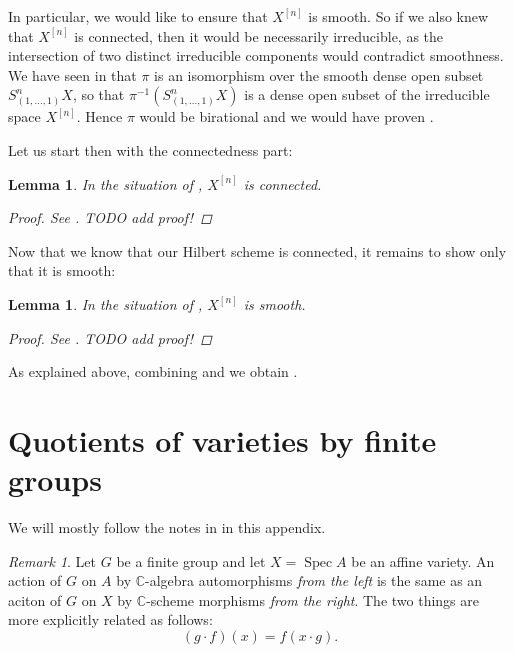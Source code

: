 \documentclass[12pt,a4paper]{amsart}
\theoremstyle{plain}
\newtheorem{lm}[thm]{Lemma}
\theoremstyle{definition}
\theoremstyle{remark}
\newtheorem{rem}[thm]{Remark}
\begin{document}
In particular, we would like to ensure that $X^{[n]}$ is smooth.
So if we also knew that $X^{[n]}$ is connected, then it would be necessarily irreducible, as the intersection of two distinct irreducible components would contradict smoothness.
We have seen in  that $\pi$ is an isomorphism over the smooth dense open subset $S^{n}_{(1,\ldots,1)}X$, so that $\pi^{-1}(S^{n}_{(1, \ldots, 1)}X)$ is a dense open subset of the irreducible space $X^{[n]}$.
Hence $\pi$ would be birational and we would have proven .

Let us start then with the connectedness part:

\begin{lm}\label{lm:connected}
  In the situation of , $X^{[n]}$ is connected.

  \begin{proof}
    See \cite[Example 4.5.10]{hl97}.
    \color{red} TODO add proof! \color{black}
  \end{proof}
\end{lm}

Now that we know that our Hilbert scheme is connected, it remains to show only that it is smooth:

\begin{lm}\label{lm:smoothness}
  In the situation of , $X^{[n]}$ is smooth.

  \begin{proof}
    See \cite[Example 4.5.10]{hl97}.
    \color{red} TODO add proof! \color{black}
  \end{proof}
\end{lm}

As explained above, combining  and  we obtain .

\appendix

\section{Quotients of varieties by finite groups}\label{sec:quotient}

We will mostly follow the notes in \cite[Appendix A]{mus11} in this appendix.

\begin{rem}
  Let $G$ be a finite group and let $X = \operatorname{Spec}{A}$ be an affine variety.
  An action of $G$ on $A$ by $\mathbb{C}$-algebra automorphisms \textit{from the left} is the same as an aciton of $G$ on $X$ by $\mathbb{C}$-scheme morphisms \textit{from the right}.
  The two things are more explicitly related as follows:
  \[ (g \cdot f)(x) = f(x \cdot g). \]
\end{rem}
\end{document}

